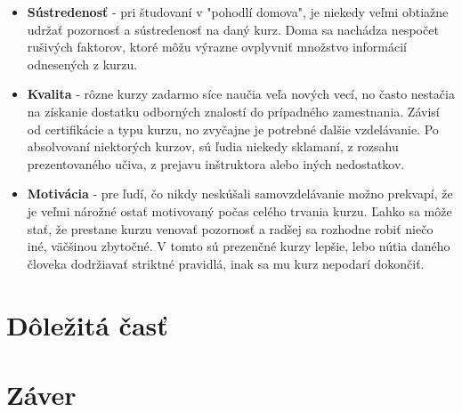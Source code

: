 \documentclass[10pt,twoside,slovak,a4paper]{article}
\begin{document}
\begin{itemize}
  \item \textbf{Sústredenosť} - pri študovaní v "pohodlí domova", je niekedy veľmi obtiažne udržať pozornosť a sústredenosť na daný kurz. Doma sa nachádza nespočet rušivých faktorov, ktoré môžu výrazne ovplyvniť množstvo informácií odnesených z kurzu. 
  \item \textbf{Kvalita} - rôzne kurzy zadarmo síce naučia veľa nových vecí, no často nestačia na získanie dostatku odborných znalostí do prípadného zamestnania. Závisí od certifikácie a typu kurzu, no zvyčajne je potrebné ďalšie vzdelávanie. Po absolvovaní niektorých kurzov, sú ľudia niekedy sklamaní, z rozsahu prezentovaného učiva, z prejavu inštruktora alebo iných nedostatkov.
  \item \textbf{Motivácia} - pre ľudí, čo nikdy neskúšali samovzdelávanie možno prekvapí, že je veľmi nárožné ostať motivovaný počas celého trvania kurzu. Ľahko sa môže stať, že prestane kurzu venovať pozornosť a radšej sa rozhodne robiť niečo iné, väčšinou zbytočné. V tomto sú prezenčné kurzy lepšie, lebo nútia daného človeka dodržiavať striktné pravidlá, inak sa mu kurz nepodarí dokončiť.
\end{itemize}

\section{Dôležitá časť} \label{dolezita}

\section{Záver} \label{zaver}



\end{document}
